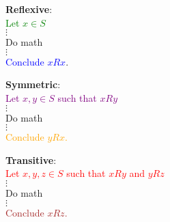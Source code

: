 \documentclass[11pt, oneside]{article}
\begin{document}
 		\begin{multicols}{3}
		 \begin{minipage}{2in}
		 \begin{center}
		 \textbf{Reflexive}: \\
		 \textcolor{green}{Let $x \in S$}   \\
       	  	  $\vdots$ \\ Do math   \\ $\vdots$ \\  
       		    \textcolor{blue}{Conclude $xRx$}.\\[0.2in] 
         	  \end{center} \end{minipage}
          	 \begin{minipage}{2in} \begin{center} 
          	 \textbf{Symmetric}:\\
          	 \textcolor{purple}{Let $x,y \in S$ such that $xRy$}\\
          	  $\vdots$ \\ Do math   \\ $\vdots$ \\  
         	   \textcolor{orange}{Conclude $yRx$.} \\[0.2in] \end{center} 
          	  \end{minipage}  \begin{minipage}{2in} \begin{center} 
          	  \textbf{Transitive}:\\
           	 \textcolor{red}{Let $x,y,z \in S$ such that $xRy$ and $yRz$}\\
                 $\vdots$ \\ Do math   \\ $\vdots$ \\  
                 \textcolor{brown}{Conclude $xRz$.}\\[0.2in]
              \end{center}  \end{minipage} \end{multicols}
                 
\end{document}
